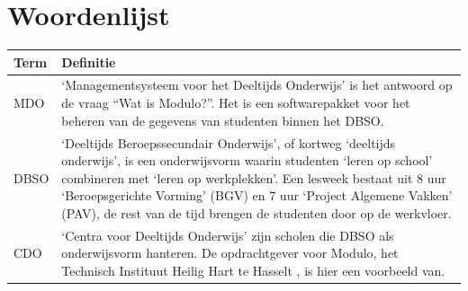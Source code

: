 \documentclass[a4paper]{article}
\begin{document}
\section{Woordenlijst}  \label{sec:word_list} %
\def\arraystretch{1.8}
\begin{tabularx}{\textwidth}{l | X}
    Term & Definitie \\
    \hline \hline
    MDO &`Managementsysteem voor het Deeltijds Onderwijs' is het antwoord op de vraag ``Wat is Modulo?''. Het is een softwarepakket voor het beheren van de gegevens van studenten binnen het DBSO. \\
    \hline
    DBSO & `Deeltijds Beroepssecundair Onderwijs', of kortweg `deeltijds onderwijs', is een onderwijsvorm waarin studenten `leren op school' combineren met `leren op werkplekken'. Een lesweek bestaat uit 8 uur `Beroepsgerichte Vorming' (BGV) en 7 uur `Project Algemene Vakken' (PAV), de rest van de tijd brengen de studenten door op de werkvloer. \cite{DBSO} \\
    \hline
    CDO & `Centra voor Deeltijds Onderwijs' zijn scholen die DBSO als onderwijsvorm hanteren. De opdrachtgever voor Modulo, het Technisch Instituut Heilig Hart te Hasselt \cite{TIHH}, is hier een voorbeeld van. \cite{CDO} \\
\end{tabularx}
\end{document}
